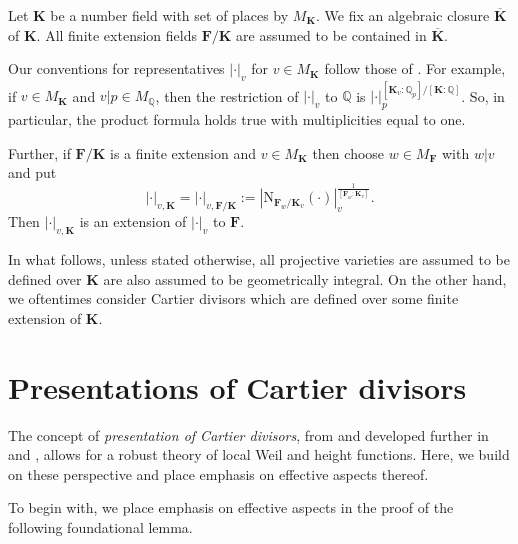 \documentclass[10pt]{amsart}
\newcommand{\KK}{\mathbf{K}}
\newcommand{\FF}{\mathbf{F}}
\newcommand{\QQ}{\mathbb{Q}} %
\theoremstyle{definition}
\numberwithin{equation}{section}
\begin{document}
Let $\KK$ be a number field with set of places by $M_{\KK}$.  We fix an algebraic closure $\overline{\KK}$ of $\KK$.  All finite extension fields $\FF / \KK$ are assumed to be contained in $\overline{\KK}$.

Our conventions for representatives $|\cdot|_v$ for $v \in M_{\KK}$ follow those of \cite[Section 2.1]{Grieve:qualitative:subspace}.  For example, if $v \in M_{\KK}$ and $v | p \in M_{\QQ}$, then the restriction of $|\cdot|_v$ to $\QQ$ is $|\cdot|_p^{[\KK_v:\QQ_p]/[\KK:\QQ]}$.  So, in particular, the product formula holds true with multiplicities equal to one. 

Further, if $\FF / \KK$  is a finite extension and $v \in M_{\KK}$ then choose $w \in M_{\FF}$ with $w | v$ and put 
$$|\cdot|_{v,\KK} = |\cdot|_{v,\FF/\KK} := |\mathrm{N}_{\FF_w/\KK_v}(\cdot)|_v^{\frac{1}{[\FF_w:\KK_v]}} \text{.}$$  
Then $|\cdot|_{v,\KK}$ is an extension of $|\cdot|_v$ to $\FF$.

In what follows, unless stated otherwise, all projective varieties are assumed to be defined over $\KK$ are also assumed to be geometrically integral.  On the other hand, we oftentimes consider Cartier divisors which are defined over some finite extension of $\KK$.

\section{Presentations of Cartier divisors}\label{Presentations:Cartier:divisors}

The concept of \emph{presentation of Cartier divisors}, from \cite{Bombieri:Gubler} and developed further in \cite{Grieve:Divisorial:Instab:Vojta} and \cite{Grieve:qualitative:subspace}, allows for a robust theory of local Weil and height functions.  Here, we build on these perspective and place emphasis on effective aspects thereof.

To begin with, we place emphasis on effective aspects in the proof of the following foundational lemma.
\end{document}
